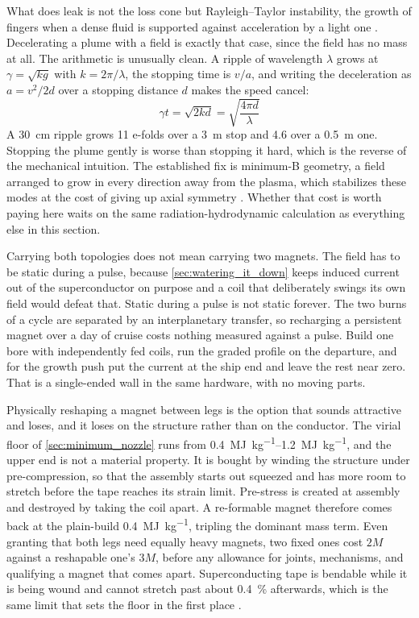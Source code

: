 \documentclass{article}
\begin{document}
What does leak is not the loss cone but Rayleigh--Taylor instability, the growth of fingers when a dense fluid is supported against acceleration by a light one \cite{chandrasekhar1961hydrodynamic}. Decelerating a plume with a field is exactly that case, since the field has no mass at all. The arithmetic is unusually clean. A ripple of wavelength $\lambda$ grows at $\gamma = \sqrt{kg}$ with $k = 2\pi/\lambda$, the stopping time is $v/a$, and writing the deceleration as $a = v^2/2d$ over a stopping distance $d$ makes the speed cancel:
\begin{equation}\label{eq:rt_efolds}
\gamma t = \sqrt{2kd} = \sqrt{\frac{4\pi d}{\lambda}}
\end{equation}
A \SI{30}{\centi\meter} ripple grows \num{11} e-folds over a \SI{3}{\meter} stop and \num{4.6} over a \SI{0.5}{\meter} one. Stopping the plume gently is worse than stopping it hard, which is the reverse of the mechanical intuition. The established fix is minimum-B geometry, a field arranged to grow in every direction away from the plasma, which stabilizes these modes at the cost of giving up axial symmetry \cite{chen2016plasma}. Whether that cost is worth paying here waits on the same radiation-hydrodynamic calculation as everything else in this section.

Carrying both topologies does not mean carrying two magnets. The field has to be static during a pulse, because \autoref{sec:watering_it_down} keeps induced current out of the superconductor on purpose and a coil that deliberately swings its own field would defeat that. Static during a pulse is not static forever. The two burns of a cycle are separated by an interplanetary transfer, so recharging a persistent magnet over a day of cruise costs nothing measured against a pulse. Build one bore with independently fed coils, run the graded profile on the departure, and for the growth push put the current at the ship end and leave the rest near zero. That is a single-ended wall in the same hardware, with no moving parts.

Physically reshaping a magnet between legs is the option that sounds attractive and loses, and it loses on the structure rather than on the conductor. The virial floor of \autoref{sec:minimum_nozzle} runs from \SIrange{0.4}{1.2}{\mega\joule\per\kilogram}, and the upper end is not a material property. It is bought by winding the structure under pre-compression, so that the assembly starts out squeezed and has more room to stretch before the tape reaches its strain limit. Pre-stress is created at assembly and destroyed by taking the coil apart. A re-formable magnet therefore comes back at the plain-build \SI{0.4}{\mega\joule\per\kilogram}, tripling the dominant mass term. Even granting that both legs need equally heavy magnets, two fixed ones cost $2M$ against a reshapable one's $3M$, before any allowance for joints, mechanisms, and qualifying a magnet that comes apart. Superconducting tape is bendable while it is being wound and cannot stretch past about \SI{0.4}{\percent} afterwards, which is the same limit that sets the floor in the first place \cite{rebco_tapes}.
\end{document}

